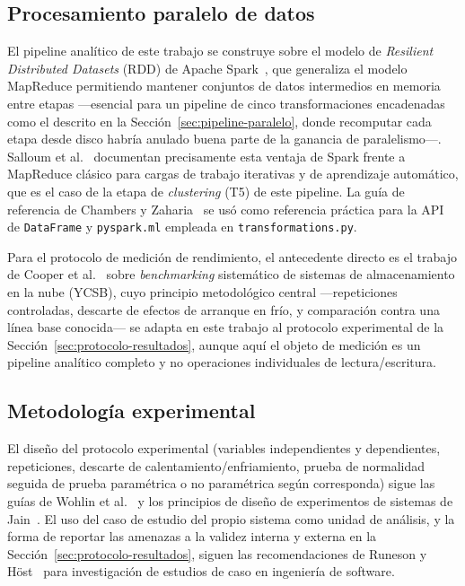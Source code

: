 \documentclass[11pt,letterpaper]{article}
\begin{document}
\subsection{Procesamiento paralelo de datos}

El pipeline analítico de este trabajo se construye sobre el modelo de \emph{Resilient Distributed
Datasets} (RDD) de Apache Spark~\cite{zaharia2012rdd}, que generaliza el modelo MapReduce
permitiendo mantener conjuntos de datos intermedios en memoria entre etapas —esencial para un
pipeline de cinco transformaciones encadenadas como el descrito en la
Sección~\ref{sec:pipeline-paralelo}, donde recomputar cada etapa desde disco habría anulado buena
parte de la ganancia de paralelismo—. Salloum et al.~\cite{salloum2016bigdata} documentan
precisamente esta ventaja de Spark frente a MapReduce clásico para cargas de trabajo iterativas y
de aprendizaje automático, que es el caso de la etapa de \emph{clustering} (T5) de este pipeline.
La guía de referencia de Chambers y Zaharia~\cite{chambers2018spark} se usó como referencia práctica
para la API de \texttt{DataFrame} y \texttt{pyspark.ml} empleada en \texttt{transformations.py}.

Para el protocolo de medición de rendimiento, el antecedente directo es el trabajo de
Cooper et al.~\cite{cooper2010ycsb} sobre \emph{benchmarking} sistemático de sistemas de
almacenamiento en la nube (YCSB), cuyo principio metodológico central —repeticiones controladas,
descarte de efectos de arranque en frío, y comparación contra una línea base conocida— se adapta en
este trabajo al protocolo experimental de la Sección~\ref{sec:protocolo-resultados}, aunque aquí el
objeto de medición es un pipeline analítico completo y no operaciones individuales de
lectura/escritura.

\subsection{Metodología experimental}

El diseño del protocolo experimental (variables independientes y dependientes, repeticiones,
descarte de calentamiento/enfriamiento, prueba de normalidad seguida de prueba paramétrica o no
paramétrica según corresponda) sigue las guías de Wohlin et al.~\cite{wohlin2012experimentation}
y los principios de diseño de experimentos de sistemas de Jain~\cite{jain1991art}. El uso del caso
de estudio del propio sistema como unidad de análisis, y la forma de reportar las amenazas a la
validez interna y externa en la Sección~\ref{sec:protocolo-resultados}, siguen las recomendaciones
de Runeson y Höst~\cite{runeson2009guidelines} para investigación de estudios de caso en ingeniería
de software.
\end{document}

